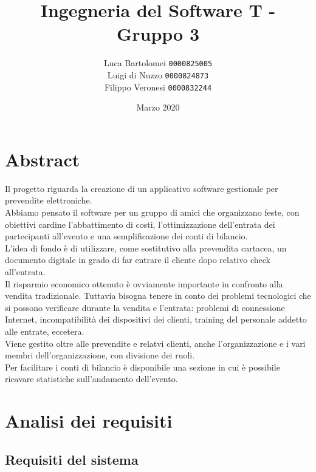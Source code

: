 \documentclass[a4paper]{article}
\title{Ingegneria del Software T - Gruppo 3}
\author{
    Luca Bartolomei 
    \texttt{0000825005}
    \\
    Luigi di Nuzzo
    \texttt{0000824873}
    \\
    Filippo Veronesi
    \texttt{0000832244}
}
\date{Marzo 2020}
\begin{document}
\newcommand{\mc}[2]{\multicolumn{#1}{>{\setlength{\hsize}{#1\hsize}}X|}{#2}}
\newcommand{\mcc}[2]{\multicolumn{#1}{|l|}{#2}}

\maketitle

\tableofcontents

\newpage

\section{Abstract}

Il progetto riguarda la creazione di un applicativo software gestionale per prevendite elettroniche.\\Abbiamo pensato il software per un gruppo di amici che organizzano feste, con obiettivi cardine l'abbattimento di costi, l'ottimizzazione dell'entrata dei partecipanti all'evento e una semplificazione dei conti di bilancio.\\L'idea di fondo è di utilizzare, come sostitutivo alla prevendita cartacea, un documento digitale in grado di far entrare il cliente dopo relativo check all'entrata.\\Il risparmio economico ottenuto è ovviamente importante in confronto alla vendita tradizionale. Tuttavia bisogna tenere in conto dei problemi tecnologici che si possono verificare durante la vendita e l'entrata: problemi di connessione Internet, incompatibilità dei dispositivi dei clienti, training del personale addetto alle entrate, eccetera.\\Viene gestito oltre alle prevendite e relatvi clienti, anche l'organizzazione e i vari membri dell'organizzazione, con divisione dei ruoli.\\Per facilitare i conti di bilancio è disponibile una sezione in cui è possibile ricavare statistiche sull'andamento dell'evento.

\newpage

\section{Analisi dei requisiti}

\subsection{Requisiti del sistema}

\end{document}
